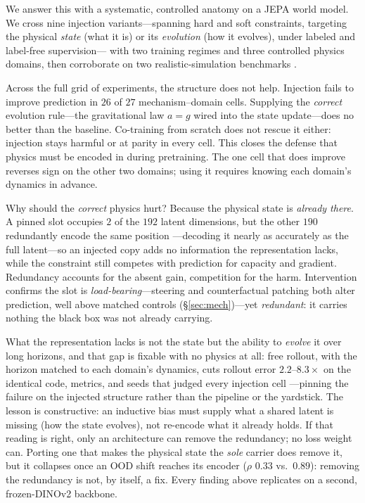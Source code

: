 We answer this with a systematic, controlled anatomy on a JEPA world model. We cross nine injection variants---spanning hard and soft constraints,
targeting the physical \emph{state} (what it is) or its \emph{evolution} (how it evolves), under labeled and label-free supervision---
with two training regimes and three controlled physics domains, then corroborate on two realistic-simulation benchmarks \citep{bear2021physion,tung2023physionpp}.

Across the full grid of experiments, the structure does not help. Injection fails to improve prediction in $26$ of $27$ mechanism--domain cells.
Supplying the \emph{correct} evolution rule---the gravitational law $a{=}g$ wired into the state update---does no better than the baseline.
Co-training from scratch does not rescue it either: injection stays harmful or at parity in every cell.
This closes the defense that physics must be encoded in during pretraining.
The one cell that does improve reverses sign on the other two domains; using it requires knowing each domain's dynamics in advance.

Why should the \emph{correct} physics hurt? Because the physical state is \emph{already there}.
A pinned slot occupies $2$ of the $192$ latent dimensions, but the other $190$ redundantly encode the same position
---decoding it nearly as accurately as the full latent---so an injected copy adds no information the representation lacks, 
while the constraint still competes with prediction for capacity and gradient. 
Redundancy accounts for the absent gain, competition for the harm. 
Intervention confirms the slot is \emph{load-bearing}---steering and counterfactual patching both alter prediction,
well above matched controls (\S\ref{sec:mech})---yet \emph{redundant}: it carries nothing the black box was not already carrying.

What the representation lacks is not the state but the ability to \emph{evolve} it over long horizons, 
and that gap is fixable with no physics at all: free rollout, with the horizon matched to each domain's dynamics, 
cuts rollout error $2.2$--$8.3\times$ on the identical code, metrics, and seeds that judged every injection cell
---pinning the failure on the injected structure rather than the pipeline or the yardstick. 
The lesson is constructive: an inductive bias must supply what a shared latent is missing (how the state evolves), 
not re-encode what it already holds. 
If that reading is right, only an architecture can remove the redundancy; no loss weight can. 
Porting one that makes the physical state the \emph{sole} carrier \citep{mao2024piwm} does remove it, 
but it collapses once an OOD shift reaches its encoder ($\rho$ $0.33$ vs.\ $0.89$): removing the redundancy is not, by itself, a fix. 
Every finding above replicates on a second, frozen-DINOv2 backbone.

